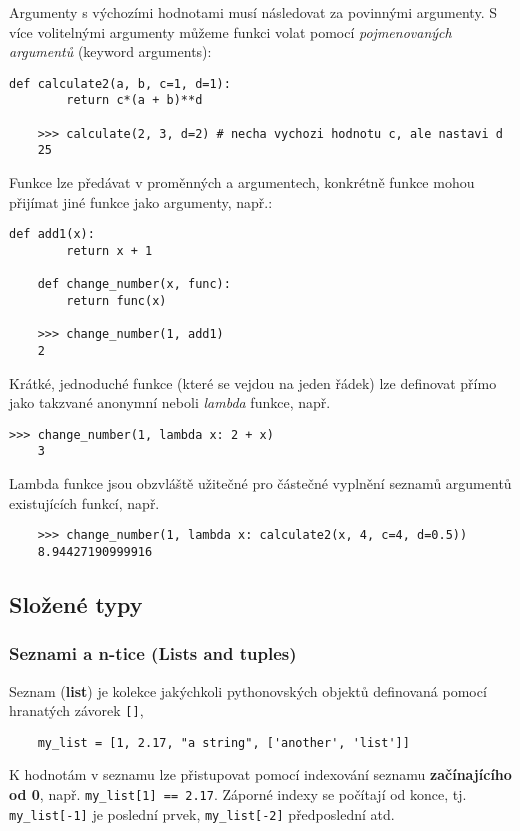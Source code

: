 Argumenty s výchozími hodnotami musí následovat za povinnými argumenty. S více volitelnými argumenty můžeme funkci volat pomocí \emph{pojmenovaných argumentů} (keyword arguments):
\begin{lstlisting}[caption=Volitelné a pojmenované argumenty.]
    def calculate2(a, b, c=1, d=1):
        return c*(a + b)**d

    >>> calculate(2, 3, d=2) # necha vychozi hodnotu c, ale nastavi d
    25
\end{lstlisting}

Funkce lze předávat v proměnných a argumentech, konkrétně funkce mohou přijímat jiné funkce jako argumenty, např.:
\begin{lstlisting}[caption=Funkce vyššího řádu.]
    def add1(x):
        return x + 1

    def change_number(x, func):
        return func(x)

    >>> change_number(1, add1)
    2
\end{lstlisting}

Krátké, jednoduché funkce (které se vejdou na jeden řádek) lze definovat přímo jako takzvané anonymní neboli \emph{lambda} funkce, např.
\begin{lstlisting}[caption=Lambda funkce.]
    >>> change_number(1, lambda x: 2 + x)
    3
\end{lstlisting}
Lambda funkce jsou obzvláště užitečné pro částečné vyplnění seznamů argumentů existujících funkcí, např.
\begin{lstlisting}
    >>> change_number(1, lambda x: calculate2(x, 4, c=4, d=0.5))
    8.94427190999916
\end{lstlisting}

\subsection{Složené typy}

\subsubsection{Seznami a n-tice (Lists and tuples)}
Seznam (\textbf{list}) je kolekce jakýchkoli pythonovských objektů definovaná pomocí hranatých závorek \verb|[]|,
\begin{lstlisting}
    my_list = [1, 2.17, "a string", ['another', 'list']]
\end{lstlisting}
K hodnotám v seznamu lze přistupovat pomocí indexování seznamu \textbf{začínajícího od 0}, např. \verb|my_list[1] == 2.17|. Záporné indexy se počítají od konce, tj. \verb|my_list[-1]| je poslední prvek, \verb|my_list[-2]| předposlední atd.

